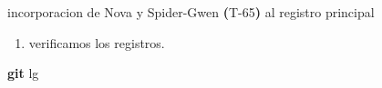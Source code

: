 \documentclass[
]{book}
\newenvironment{Shaded}{\begin{snugshade}}{\end{snugshade}}
\newcommand{\ErrorTok}[1]{\textcolor[rgb]{0.64,0.00,0.00}{\textbf{#1}}}
\newcommand{\ExtensionTok}[1]{#1}
\newcommand{\FunctionTok}[1]{\textcolor[rgb]{0.13,0.29,0.53}{\textbf{#1}}}
\newcommand{\KeywordTok}[1]{\textcolor[rgb]{0.13,0.29,0.53}{\textbf{#1}}}
\newcommand{\NormalTok}[1]{#1}
\providecommand{\tightlist}{%
  \setlength{\itemsep}{0pt}\setlength{\parskip}{0pt}}
\begin{document}
\begin{Shaded}
\begin{Highlighting}[]
\ExtensionTok{[main}\NormalTok{ 7e666cc] incorporacion de Nova y Spider{-}Gwen }\ErrorTok{(}\ExtensionTok{T{-}65}\KeywordTok{)} \ExtensionTok{al}\NormalTok{ registro principal}
\end{Highlighting}
\end{Shaded}

\begin{enumerate}
\def\labelenumi{\arabic{enumi}.}
\setcounter{enumi}{8}
\tightlist
\item
  verificamos los registros.
\end{enumerate}

\begin{Shaded}
\begin{Highlighting}[]
\FunctionTok{git}\NormalTok{ lg}
\end{Highlighting}
\end{Shaded}
\end{document}
